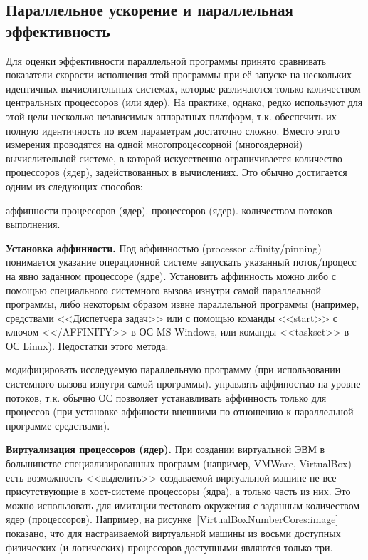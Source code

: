 \subsection{Параллельное ускорение и параллельная эффективность}

Для оценки эффективности параллельной программы принято сравнивать показатели скорости исполнения этой программы при её запуске на нескольких идентичных вычислительных системах, которые различаются только количеством центральных процессоров (или ядер). На практике, однако, редко используют для этой цели несколько независимых аппаратных платформ, т.к. обеспечить их полную идентичность по всем параметрам достаточно сложно. Вместо этого измерения проводятся на одной многопроцессорной (многоядерной) вычислительной системе, в которой искусственно ограничивается количество процессоров (ядер), задействованных в вычислениях. Это обычно достигается одним из следующих способов:

\begin{itemize}
     аффинности процессоров (ядер).
     процессоров (ядер).
     количеством потоков выполнения.
\end{itemize}

\textbf{Установка аффинности.} Под аффинностью (processor affin\-i\-ty/pin\-ning) понимается указание операционной системе запускать указанный поток/процесс на явно заданном процессоре (ядре). Установить аффинность можно либо с помощью специального системного вызова изнутри самой параллельной программы, либо некоторым образом извне параллельной программы (например, средствами <<Диспетчера задач>> или с помощью команды <<start>> с ключом <</AFFINITY>> в ОС MS Windows, или команды <<taskset>> в ОС Linux). Недостатки этого метода:

\begin{itemize}
     модифицировать исследуемую параллельную программу (при использовании системного вызова изнутри самой программы).
     управлять аффиностью на уровне потоков, т.к. обычно ОС позволяет устанавливать аффинность только для процессов (при установке аффиности внешними по отношению к параллельной программе средствами).
\end{itemize}

\textbf{Виртуализация процессоров (ядер).} При создании виртуальной ЭВМ в большинстве специализированных программ (например, VMWare, Virtual\-Box) есть возможность <<выделить>> создаваемой виртуальной машине не все присутствующие в хост-системе процессоры (ядра), а только часть из них. Это можно использовать для имитации тестового окружения с заданным количеством ядер (процессоров). Например, на рисунке~\ref{VirtualBoxNumberCores:image} показано, что для настраиваемой виртуальной машины из восьми доступных физических (и логических) процессоров доступными являются только три.

